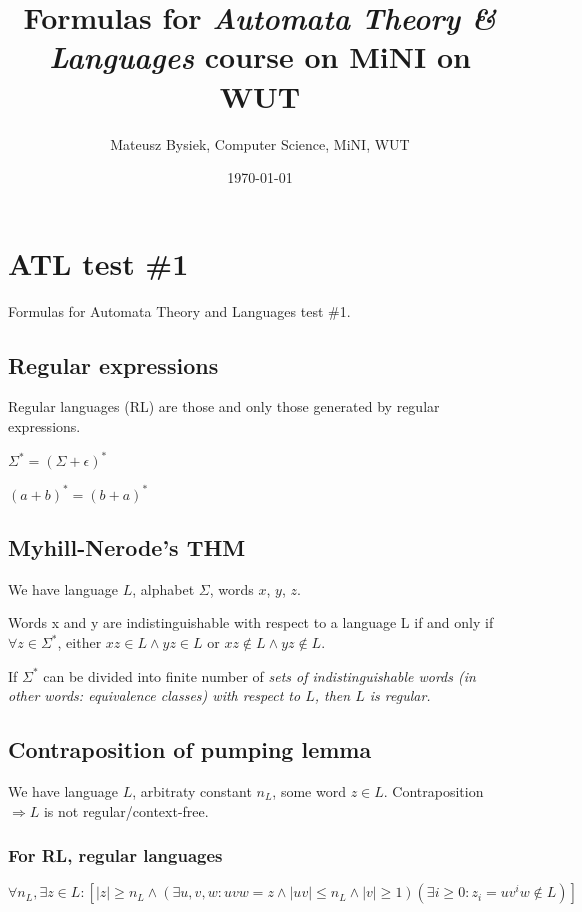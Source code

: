 \documentclass{article}
\begin{document}
\title{Formulas for \emph{Automata Theory \& Languages} course on MiNI on WUT}
\date{\today}
\author{Mateusz Bysiek, Computer Science, MiNI, WUT}
\maketitle

\tableofcontents

\pagebreak[4]

\section{ATL test \#1}
Formulas for Automata Theory and Languages test \#1.

\subsection{Regular expressions}
Regular languages (RL) are those and only those generated by regular expressions.

$\Sigma^* = (\Sigma+\epsilon)^*$

$(a+b)^* = (b+a)^*$

\subsection{Myhill-Nerode's THM}
We have language $L$, alphabet $\Sigma$, words $x$, $y$, $z$.

Words x and y are indistinguishable with respect to a language L if and only if $\forall z \in \Sigma^*$,
either $xz \in L \wedge yz \in L$ or $xz \not\in L \wedge yz \not\in L$.

If $\Sigma^*$ can be divided into finite number of \em sets of indistinguishable words \em
(in other words: equivalence classes) with respect to $L$, then $L$ is regular.

\subsection{Contraposition of pumping lemma}
We have language $L$, arbitraty constant $n_L$, some word $z \in L$. 
Contraposition $\Rightarrow L$ is not regular/context-free.

\subsubsection{For RL, regular languages}
$\forall n_L , \exists z \in L : 
\left[
|z| \geq n_L 
\wedge \left( \exists u,v,w : uvw = z \wedge |uv| \leq n_L \wedge |v| \geq 1 \right)
\left( \exists i \geq 0 : z_i = uv^iw \not\in L \right) 
\right]$
\end{document}
